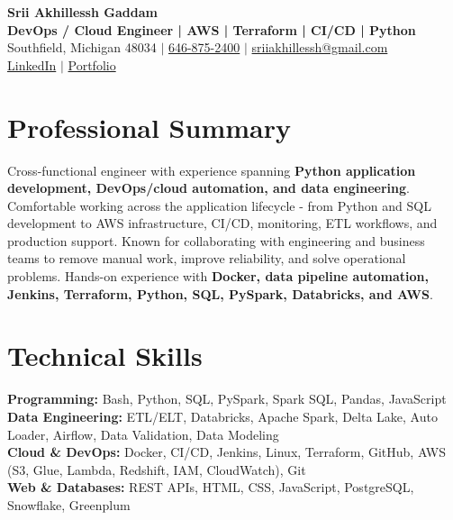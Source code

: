 \documentclass[letterpaper,10pt]{article}
\begin{document}
\fontsize{9.35pt}{10.45pt}\selectfont

\begin{center}
    {\LARGE \textbf{Srii Akhillessh Gaddam}} \\[-1pt]
    \textbf{DevOps / Cloud Engineer | AWS | Terraform | CI/CD | Python} \\[2pt]
    Southfield, Michigan 48034 $|$
    \href{tel:6468752400}{646-875-2400} $|$
    \href{mailto:sriiakhillessh@gmail.com}{sriiakhillessh@gmail.com} \\[1pt]
    \href{https://www.linkedin.com/in/srii-akhiilessh-gaddam-b48668191/}{LinkedIn} $|$
    \href{https://sriiakhillesshg.github.io/portfolio/}{Portfolio}
\end{center}
\vspace{-8pt}

\section{Professional Summary}
\small{Cross-functional engineer with experience spanning \textbf{Python application development, DevOps/cloud automation, and data engineering}. Comfortable working across the application lifecycle - from Python and SQL development to AWS infrastructure, CI/CD, monitoring, ETL workflows, and production support. Known for collaborating with engineering and business teams to remove manual work, improve reliability, and solve operational problems. Hands-on experience with \textbf{Docker, data pipeline automation, Jenkins, Terraform, Python, SQL, PySpark, Databricks, and AWS}.}

\section{Technical Skills}
\small{
\textbf{Programming:} Bash, Python, SQL, PySpark, Spark SQL, Pandas, JavaScript \\
\textbf{Data Engineering:} ETL/ELT, Databricks, Apache Spark, Delta Lake, Auto Loader, Airflow, Data Validation, Data Modeling \\
\textbf{Cloud \& DevOps:} Docker, CI/CD, Jenkins, Linux, Terraform, GitHub, AWS (S3, Glue, Lambda, Redshift, IAM, CloudWatch), Git \\
\textbf{Web \& Databases:} REST APIs, HTML, CSS, JavaScript, PostgreSQL, Snowflake, Greenplum
}
\end{document}
